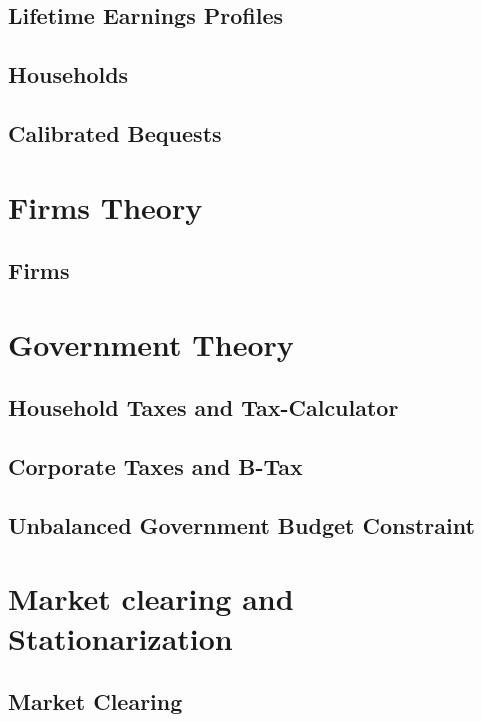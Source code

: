 \documentclass[letterpaper,12pt]{book}
\theoremstyle{definition}
\numberwithin{equation}{chapter}
\begin{document}
  \chapter{Lifetime Earnings Profiles}\label{Chap_LfEarn}
    
  \chapter{Households}\label{Chap_House}
    
  \chapter{Calibrated Bequests}\label{Chap_Beq}
    

\part{Firms Theory}\label{PartFirmTheory}
  \chapter{Firms}\label{Chap_Firms}
    

\part{Government Theory}\label{PartGovtTheory}
  \chapter{Household Taxes and Tax-Calculator}\label{Chap_TaxCalc}
    
  \chapter{Corporate Taxes and B-Tax}\label{Chap_BTax}
    
  \chapter{Unbalanced Government Budget Constraint}\label{Chap_UnbalGBC}
    

\part{Market clearing and Stationarization}\label{PartMCstat}
  \chapter{Market Clearing}\label{Chap_MarkClr}
    
\end{document}
